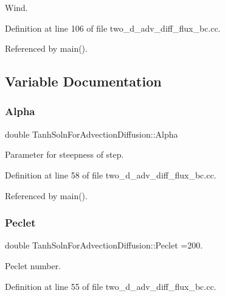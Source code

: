 Wind. 



Definition at line 106 of file two\+\_\+d\+\_\+adv\+\_\+diff\+\_\+flux\+\_\+bc.\+cc.



Referenced by main().



\subsection{Variable Documentation}
\mbox{\label{namespaceTanhSolnForAdvectionDiffusion_a4d202e8ac48cc75f760ef40681402ec7}} 
\subsubsection{\texorpdfstring{Alpha}{Alpha}}
{\footnotesize\ttfamily double Tanh\+Soln\+For\+Advection\+Diffusion\+::\+Alpha}



Parameter for steepness of step. 



Definition at line 58 of file two\+\_\+d\+\_\+adv\+\_\+diff\+\_\+flux\+\_\+bc.\+cc.



Referenced by main().

\mbox{\label{namespaceTanhSolnForAdvectionDiffusion_aeba486af70e92ab7eec1da3ce44d51ee}} 
\subsubsection{\texorpdfstring{Peclet}{Peclet}}
{\footnotesize\ttfamily double Tanh\+Soln\+For\+Advection\+Diffusion\+::\+Peclet =200.}



Peclet number. 



Definition at line 55 of file two\+\_\+d\+\_\+adv\+\_\+diff\+\_\+flux\+\_\+bc.\+cc.



